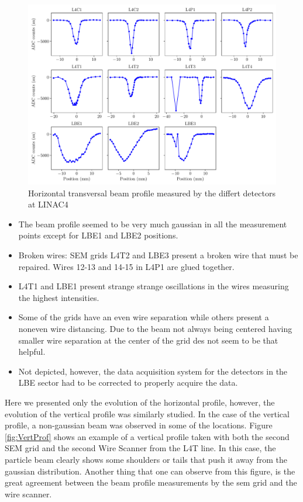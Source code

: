 \begin{figure}
    \centering
    \includegraphics[width=1.0\columnwidth]{SigmaEvol/HorEvol.pdf}
    \caption{Horizontal transversal beam profile measured by the differt detectors at LINAC4}
    \label{fig:HorizontalProf}
\end{figure}

\begin{itemize}
    \item The beam profile seemed to be very much gaussian in all the measurement points except for LBE1 and LBE2 positions.
    \item Broken wires: SEM grids L4T2 and LBE3 present a broken wire that must be repaired. Wires 12-13 and 14-15 in L4P1 are glued together. 
    \item L4T1 and LBE1 present strange strange oscillations in the wires measuring the highest intensities. 
    \item Some of the grids have an even wire separation while others present a noneven wire distancing. Due to the beam not always being centered having smaller wire separation at the center of the grid des not seem to be that helpful.
    \item Not depicted, however, the data acquisition system for the detectors in the LBE sector had to be corrected to properly acquire the data.
\end{itemize}

Here we presented only the evolution of the horizontal profile, however, the evolution of the vertical profile was similarly studied. In the case of the vertical profile, a non-gaussian beam was observed in some of the locations. Figure \ref{fig:VertProf} shows an example of a vertical profile taken with both the second SEM grid and the second Wire Scanner from the L4T line. In this case, the particle beam clearly shows some shoulders or tails that push it away from the gaussian distribution. Another thing that one can observe from this figure, is the great agreement between the beam profile measurements by the sem grid and the wire scanner. 


